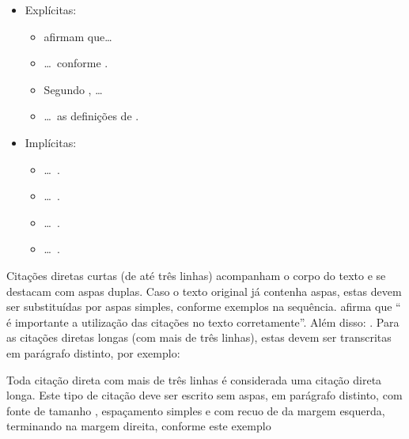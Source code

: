 \documentclass[%
  a4paper,%
  12pt,%
  fleqn,%
  english,%
  brazilian,%
]{article}
\begin{document}
\begin{OverleafFreePlan}
\begin{itemize}
\item Explícitas:
\begin{itemize}
\item \textcite{Alencar2007} afirmam que\ldots%
\item \ldots\ conforme \textcite{Kalakota2002,Ramos2003}.
\item Segundo \textcite{Carvalho2004,Andujar2006,Purcidonio2008}, \ldots%
\item \ldots\ as definições de \textcite{Alencar2007,Carvalho2004}.
\end{itemize}
\item Implícitas:
\begin{itemize}
\item \ldots\ \cite{Alencar2007}.
\item \ldots\ \cite{Kalakota2002,Ramos2003}.
\item \ldots\ \cite{Carvalho2004,Andujar2006,Purcidonio2008}.
\item \ldots\ \cite{Alencar2007,Carvalho2004}.
\end{itemize}
\end{itemize}

Citações diretas curtas (de até três linhas) acompanham o corpo do texto e se destacam com aspas duplas.
Caso o texto original já contenha aspas, estas devem ser substituídas por aspas simples, conforme exemplos na sequência.
\textcite{Tal2021a} afirma que \enquote{\textelp{} é importante a utilização das citações no texto corretamente}.
Além disso: .
Para as citações diretas longas (com mais de três linhas), estas devem ser transcritas em parágrafo distinto, por exemplo:

\begin{DisplayCitation}[brazilian]{\cite{Tal2021a}}
Toda citação direta com mais de três linhas é considerada uma citação direta longa.
Este tipo de citação deve ser escrito sem aspas, em parágrafo distinto, com fonte de tamanho , espaçamento simples e com recuo de  da margem esquerda, terminando na margem direita, conforme este exemplo
\end{DisplayCitation}


\end{OverleafFreePlan}
\end{document}
